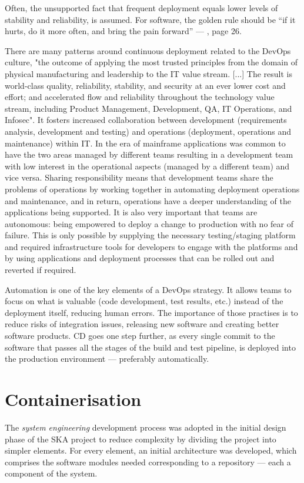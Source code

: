 \documentclass[a4paper,
	       keeplastbox,   %
	       References
	       ]{jacow}
\begin{document}
Often, the unsupported fact that frequent deployment equals lower levels of stability and reliability, is assumed. For software, the golden rule should be “if it hurts, do it more often, and bring the pain forward” — \cite{CD}, page 26.

There are many patterns around continuous deployment related to the DevOps culture\cite{DevOps}, "the outcome of applying the most trusted principles from the domain of physical manufacturing and leadership to the IT value stream. [...] The result is world-class quality, reliability, stability, and security at an ever lower cost and effort; and accelerated flow and reliability throughout the technology value stream, including Product Management, Development, QA, IT Operations, and Infosec". It fosters increased collaboration between development (requirements analysis, development and testing) and operations (deployment, operations and maintenance) within IT. In the era of mainframe applications was common to have the two areas managed by different teams resulting in a development team with low interest in the operational aspects (managed by a different team) and vice versa. Sharing responsibility means that development teams share the problems of operations by working together in automating deployment operations and maintenance, and in return, operations have a deeper understanding of the applications being supported. It is also very important that teams are autonomous: being empowered to deploy a change to production with no fear of failure. This is only possible by supplying the necessary testing/staging platform and required infrastructure tools for developers to engage with the platforms and by using applications and deployment processes that can be rolled out and reverted if required.

Automation is one of the key elements of a DevOps strategy. It allows teams to focus on what is valuable (code development, test results, etc.) instead of the deployment itself, reducing human errors. The importance of those practises is to reduce risks of integration issues, releasing new software and creating better software products. CD goes one step further, as every single commit to the software that passes all the stages of the build and test pipeline, is deployed into the production environment — preferably automatically.

\section{Containerisation} \label{containerisation}
The \textit{system engineering} development process was adopted in the initial design phase of the SKA project to reduce complexity by dividing the project into simpler elements. For every element, an initial architecture was developed, which comprises the software modules needed corresponding to a repository — each a component of the system.
\end{document}
